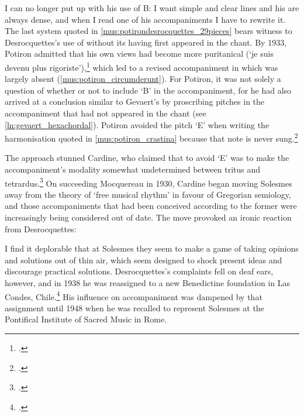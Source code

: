   {}
{I can no longer put up with his use of B\kern 1pt\flat{}: I want simple and clear lines and his are always dense, and when I read one of his accompaniments I have to rewrite it.}
\noindent
The last system quoted in \cref{mus:potirondesrocquettes_29pieces} bears witness to Desrocquettes's use of \kern 1pt\flat{} without its having first appeared in the chant.
By 1933, Potiron admitted that his own views had become more puritanical (`je suis devenu plus rigoriste'),\footcite[p.~109, n.~1]{Potironbemoldansaccompagnement1933} which led to a revised accompaniment in which  was largely absent (\cref{mus:potiron_circumderunt}).
For Potiron, it was not solely a question of whether or not to include `B'\kern 1pt\flat{} in the accompaniment, for he had also arrived at a conclusion similar to Gevaert's by proscribing pitches in the accompaniment that had not appeared in the chant (see \cref{ln:gevaert_hexachordal}).
Potiron avoided the pitch `E' when writing the harmonisation quoted in \cref{mus:potiron_crastina} because that note is never sung.\footcite[18, 60--61]{PotironGraduelparoissialcontenant1933}

The approach stunned Cardine, who claimed that to avoid `E' was to make the accompaniment's modality somewhat undetermined between tritus and tetrardus.\footcite[236]{C[ardine]ReviewHenriPotiron1933}
On succeeding Mocquereau in 1930, Cardine began moving Solesmes away from the theory of `free musical rhythm' in favour of Gregorian semiology, and those accompaniments that had been conceived according to the former were increasingly being considered out of date.
The move provoked an ironic reaction from Desrocquettes:

  {}
{I find it deplorable that at Solesmes they seem to make a game of taking opinions and solutions out of thin air, which seem designed to shock present ideas and discourage practical solutions.}
\noindent
Desrocquettes's complaints fell on deaf ears, however, and in 1938 he was reassigned to a new Benedictine foundation in Las Condes, Chile.\footcite[111]{DusselHistoryChurchLatin1981}
His influence on accompaniment was dampened by that assignment until 1948 when he was recalled to represent Solesmes at the Pontifical Institute of Sacred Music in Rome.

